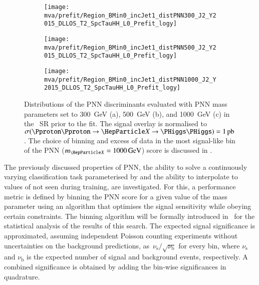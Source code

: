 \begin{figure}[htbp]
  \centering

  \begin{subfigure}[t]{.49\textwidth}
    \texttt{[image: mva/prefit/Region\_BMin0\_incJet1\_distPNN300\_J2\_Y2015\_DLLOS\_T2\_SpcTauHH\_L0\_Prefit\_logy]}
    \caption{}
    \label{fig:pnn_score_prefit_300}
  \end{subfigure}\hfill%
  \begin{subfigure}[t]{.49\textwidth}
    \centering
    \texttt{[image: mva/prefit/Region\_BMin0\_incJet1\_distPNN500\_J2\_Y2015\_DLLOS\_T2\_SpcTauHH\_L0\_Prefit\_logy]}
    \caption{}
    \label{fig:pnn_score_prefit_500}
  \end{subfigure}

  \begin{subfigure}[t]{.49\textwidth}
    \centering
    \texttt{[image: mva/prefit/Region\_BMin0\_incJet1\_distPNN1000\_J2\_Y2015\_DLLOS\_T2\_SpcTauHH\_L0\_Prefit\_logy]}
    \caption{}
    \label{fig:pnn_score_prefit_1000}
  \end{subfigure}

  \caption[Distributions of the PNN discriminants in the \hadhad
  SR.]{Distributions of the PNN discriminants evaluated with PNN mass parameters
    set to \SI{300}{\GeV} (a), \SI{500}{\GeV} (b), and \SI{1000}{\GeV} (c) in
    the \hadhad~SR prior to the fit.  The signal overlay is normalised to
    $\sigma(\Pproton\Pproton \to \PX \to \HH) = \SI{1}{\pico\barn}$. The choice
    of binning and excess of data in the most signal-like bin of the PNN
    ($\mX = \SI{1000}{\GeV}$) score is discussed in
    .}%
  \label{fig:pnn_score_prefit}
\end{figure}

The previously discussed properties of PNN, the ability to solve a
continuously varying classification task parameterised by \mX and the
ability to interpolate to values of \mX not seen during training, are
investigated. For this, a performance metric is defined by binning the
PNN score for a given value of the mass parameter using an algorithm
that optimises the signal sensitivity while obeying certain
constraints. The binning algorithm will be formally introduced
in~ for the statistical analysis of the results
of this search.
The expected signal significance is approximated, assuming independent
Poisson counting experiments without uncertainties on the background
predictions, as~$\nu_\text{s} / \sqrt{\nu_\text{b}}$ for every bin,
where $\nu_\text{s}$ and $\nu_\text{b}$ is the expected number of
signal and background events, respectively. A combined significance is
obtained by adding the bin-wise significances in quadrature.

